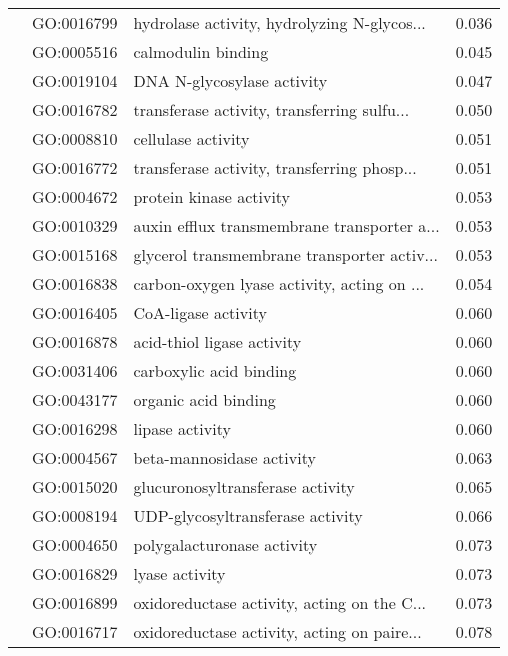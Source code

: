 \begin{longtable}{lllr}
   & GO:0016799 &  hydrolase activity, hydrolyzing N-glycos... &         0.036 \\
   & GO:0005516 &                           calmodulin binding &         0.045 \\
   & GO:0019104 &                   DNA N-glycosylase activity &         0.047 \\
   & GO:0016782 &  transferase activity, transferring sulfu... &         0.050 \\
   & GO:0008810 &                           cellulase activity &         0.051 \\
   & GO:0016772 &  transferase activity, transferring phosp... &         0.051 \\
   & GO:0004672 &                      protein kinase activity &         0.053 \\
   & GO:0010329 &  auxin efflux transmembrane transporter a... &         0.053 \\
   & GO:0015168 &  glycerol transmembrane transporter activ... &         0.053 \\
   & GO:0016838 &  carbon-oxygen lyase activity, acting on ... &         0.054 \\
   & GO:0016405 &                          CoA-ligase activity &         0.060 \\
   & GO:0016878 &                   acid-thiol ligase activity &         0.060 \\
   & GO:0031406 &                      carboxylic acid binding &         0.060 \\
   & GO:0043177 &                         organic acid binding &         0.060 \\
   & GO:0016298 &                              lipase activity &         0.060 \\
   & GO:0004567 &                    beta-mannosidase activity &         0.063 \\
   & GO:0015020 &             glucuronosyltransferase activity &         0.065 \\
   & GO:0008194 &             UDP-glycosyltransferase activity &         0.066 \\
   & GO:0004650 &                   polygalacturonase activity &         0.073 \\
   & GO:0016829 &                               lyase activity &         0.073 \\
   & GO:0016899 &  oxidoreductase activity, acting on the C... &         0.073 \\
   & GO:0016717 &  oxidoreductase activity, acting on paire... &         0.078 \\

\end{longtable}
